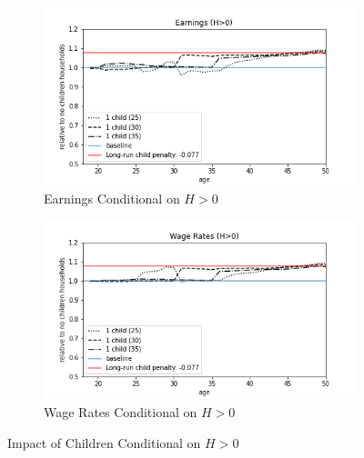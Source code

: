 \begin{figure}[ht]
\begin{subfigure}{.5\textwidth}
  \centering
  \includegraphics[width=1\linewidth]{figures/extended_model_event_earnings_H>0.png}
  \caption{Earnings Conditional on $H > 0$}
  \label{fig:ext_model_event_earnings_alt}
\end{subfigure}%
\begin{subfigure}{.5\textwidth}
  \centering
  \includegraphics[width=1\linewidth]{figures/extended_model_event_wage_rates_H>0.png}
  \caption{Wage Rates Conditional on $H>0$}
  \label{fig:ext_model_event_wage_rates_alt}
\end{subfigure}
    \caption{Impact of Children Conditional on $H>0$}
    \label{fig:ext_model_impact_alt}
\end{figure}


